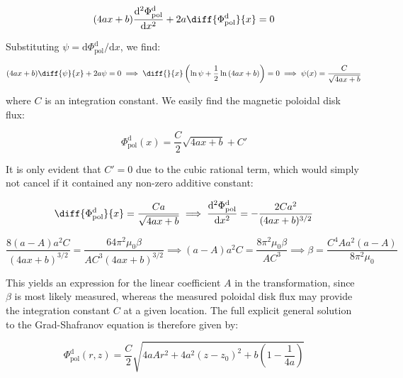 \begin{equation}
    (4ax+b)\frac{\mathrm{d}^2\Phi_\text{pol}^\mathrm{d}}{\mathrm{d}x^2}+2a\diff{\Phi_\text{pol}^\mathrm{d}}{x}=0
\end{equation}

Substituting $\psi=\mathrm{d}\Phi_\text{pol}^\mathrm{d}/\mathrm{d}x$, we find:

\begin{equation}
    (4ax+b)\diff{\psi}{x}+2a\psi=0\implies\diff{}{x}\left(\ln{\psi}+\frac{1}{2}\ln{(4ax+b)}\right)=0\implies\psi(x)=\frac{C}{\sqrt{4ax+b}}
\end{equation}

where $C$ is an integration constant. We easily find the magnetic poloidal disk flux:

\begin{equation}
    \Phi_\text{pol}^\mathrm{d}(x)=\frac{C}{2}\sqrt{4ax+b}+C'
\end{equation}

It is only evident that $C'=0$ due to the cubic rational term, which would simply not cancel if it contained any non-zero additive constant:

\begin{equation}
    \diff{\Phi_\text{pol}^\mathrm{d}}{x}=\frac{Ca}{\sqrt{4ax+b}}\implies\frac{\mathrm{d}^2\Phi_\text{pol}^\mathrm{d}}{\mathrm{d}x^2}=-\frac{2Ca^2}{(4ax+b)^{3/2}}
\end{equation}

\begin{equation}
    \frac{8(a-A)a^2C}{(4ax+b)^{3/2}}=\frac{64\pi^2\mu_0\beta}{AC^3({4ax+b})^{3/2}}\implies (a-A)a^2C=\frac{8\pi^2\mu_0\beta}{AC^3}\implies\beta=\frac{C^4Aa^2(a-A)}{8\pi^2\mu_0}
\end{equation}

This yields an expression for the linear coefficient $A$ in the transformation, since $\beta$ is most likely measured, whereas the measured poloidal disk flux may provide the integration constant $C$ at a given location. The full explicit general solution to the Grad-Shafranov equation is therefore given by:

\begin{equation}
    \Phi_\text{pol}^\mathrm{d}(r,z)=\frac{C}{2}\sqrt{4aAr^2+4a^2(z-z_0)^2+b\left(1-\frac{1}{4a}\right)}
\end{equation}

